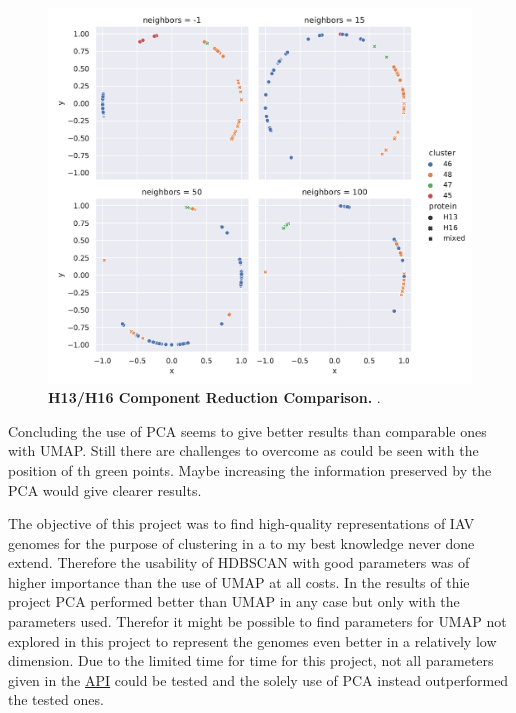 \begin{figure}[hbt]
    \centering
    \includegraphics[width=\textwidth]{PCA/Difference_Segment_4_H_metric_cosine.pdf}
    \caption[H13/H16 Component Reduction Comparison]{\textbf{H13/H16 Component Reduction Comparison.} .}
    \label{fig:Reduction_Comparison}
\end{figure}

Concluding the use of \gls{PCA} seems to give better results than comparable ones with \gls{UMAP}. Still there are challenges to overcome as could be seen with the position of th green points. Maybe increasing the information preserved by the \gls{PCA} would give clearer results. 

The objective of this project was to find high-quality representations of \gls{IAV} genomes for the purpose of clustering in a to my best knowledge never done extend. Therefore the usability of \gls{HDBSCAN} with good parameters was of higher importance than the use of \gls{UMAP} at all costs. In the results of thie project \gls{PCA} performed better than \gls{UMAP} in any case but only with the parameters used. Therefor it might be possible to find parameters for \gls{UMAP} not explored in this project to represent the genomes even better in a relatively low dimension. Due to the limited time for time for this project, not all parameters given in the \href{https://umap-learn.readthedocs.io/en/latest/api.html}{API} could be tested and the solely use of \gls{PCA} instead outperformed the tested ones. 